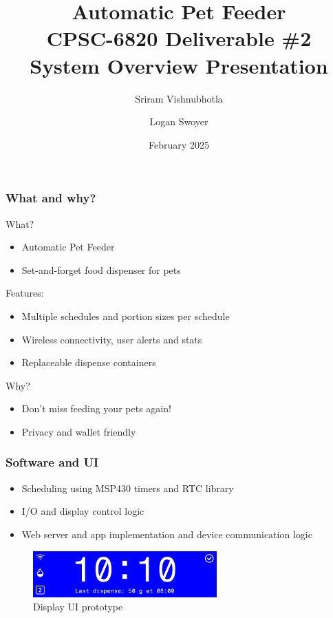 \documentclass{beamer}
\title{Automatic Pet Feeder\\
\small CPSC-6820 Deliverable \#2\\
\large System Overview Presentation}
\author{Sriram Vishnubhotla \and Logan Swoyer}
\institute{Clemson University}
\date{February 2025}
\begin{document}
\frame{\titlepage}
\begin{frame}
    \frametitle{What and why?}

    \begin{minipage}{0.5\textwidth}
        What?
        \begin{itemize}
            \item Automatic Pet Feeder
            \item Set-and-forget food dispenser for pets
        \end{itemize}
        Features:
        \begin{itemize}
            \item Multiple schedules and portion sizes per schedule
            \item Wireless connectivity, user alerts and stats
            \item Replaceable dispense containers
        \end{itemize}
        Why?
        \begin{itemize}
            \item Don't miss feeding your pets again!
            \item Privacy and wallet friendly
        \end{itemize}
    \end{minipage}
    \begin{minipage}{0.4\textwidth}
        \begin{figure}
            \centering
            \scalebox{.4}{}
        \end{figure}
    \end{minipage}
\end{frame}

\begin{frame}
    \frametitle{Software and UI}
    \begin{itemize}
        \item Scheduling using MSP430 timers and RTC library
        \item I/O and display control logic
        \item Web server and app implementation and device communication logic
    \end{itemize}
    \begin{figure}[h]
        \includegraphics[width=\textwidth]{images/displayframe.pdf}
        \caption{Display UI prototype}
    \end{figure}
\end{frame}
\end{document}
